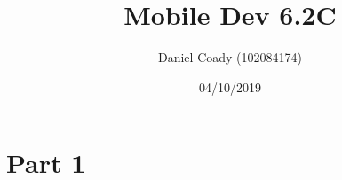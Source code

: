 \documentclass{scrartcl}
\title{Mobile Dev 6.2C}
\author{Daniel Coady (102084174)}
\date{04/10/2019}
\begin{document}
\maketitle

\section*{Part 1}
\end{document}
